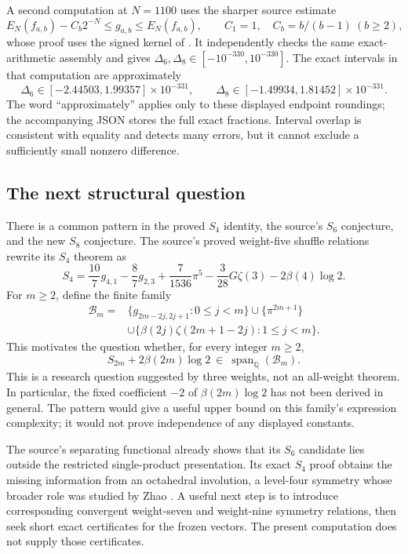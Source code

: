 A second computation at $N=1100$ uses the sharper source estimate
\[
 E_N(f_{a,b})-C_b2^{-N}\leq g_{a,b}\leq E_N(f_{a,b}),
 \qquad C_1=1,\quad C_b=b/(b-1)\ (b\geq2),
\]
whose proof uses the signed kernel of \cite{ProveIt}. It independently
checks the same exact-arithmetic assembly and gives
$\Delta_6,\Delta_8\in[-10^{-330},10^{-330}]$.
The exact intervals in that computation are approximately
\[
 \Delta_6\in[-2.44503,1.99357]\times10^{-331},\qquad
 \Delta_8\in[-1.49934,1.81452]\times10^{-331}.
\]
The word ``approximately'' applies only to these displayed endpoint
roundings; the accompanying JSON stores the full exact fractions.
Interval overlap is consistent with equality and detects many errors,
but it cannot exclude a sufficiently small nonzero difference.

\subsection{The next structural question}
There is a common pattern in the proved $S_4$ identity, the source's
$S_6$ conjecture, and the new $S_8$ conjecture. The source's proved
weight-five shuffle relations rewrite its $S_4$ theorem as
\begin{equation}\label{cont26:eq:s4-even-basket}
 S_4=\frac{10}{7}g_{4,1}-\frac87g_{2,3}
       +\frac7{1536}\pi^5-\frac3{28}G\zeta(3)
       -2\beta(4)\log2.
\end{equation}
For $m\geq2$, define the finite family
\begin{align*}
 \mathcal B_m={}&\{g_{2m-2j,2j+1}:0\leq j<m\}
                 \cup\{\pi^{2m+1}\}\\
 &\cup\{\beta(2j)\zeta(2m+1-2j):1\leq j<m\}.
\end{align*}
This motivates the question whether, for every integer $m\geq2$,
\begin{equation}
 S_{2m}+2\beta(2m)\log2\ \in\
 \operatorname{span}_{\mathbb Q}(\mathcal B_m).
 \label{cont26:eq:even-index-question}
\end{equation}
This is a research question suggested by three weights, not an
all-weight theorem. In particular, the fixed coefficient $-2$ of
$\beta(2m)\log2$ has not been derived in general. The pattern would
give a useful upper bound on this family's expression complexity;
it would not prove independence of any displayed constants.

The source's separating functional already shows that its $S_6$
candidate lies outside the restricted single-product presentation.
Its exact $S_4$ proof obtains the missing information from an
octahedral involution, a level-four symmetry whose broader role was
studied by Zhao \cite{Zhao2008}. A useful next step is to introduce
corresponding convergent weight-seven and weight-nine symmetry
relations, then seek short exact certificates for the frozen vectors.
The present computation does not supply those certificates.
